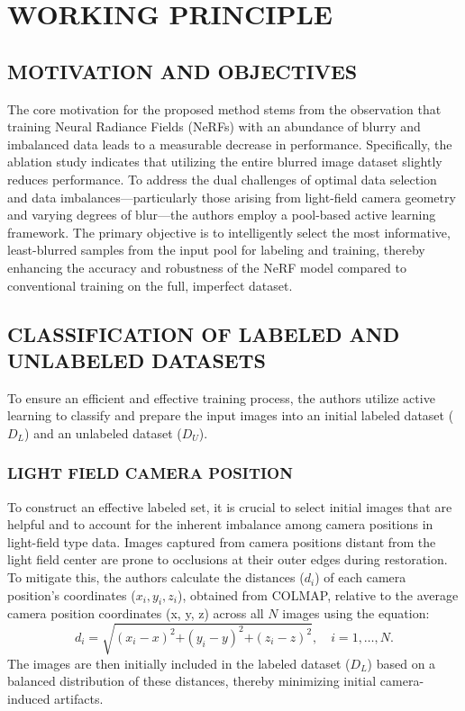 \chapter{\MakeUppercase{Working Principle}}
\setcounter{equation}{0}

\section{\MakeUppercase{Motivation and Objectives}}
The core motivation for the proposed method stems from the observation that training Neural Radiance Fields (NeRFs) with an abundance of blurry and imbalanced data leads to a measurable decrease in performance. Specifically, the ablation study indicates that utilizing the entire blurred image dataset slightly reduces performance. To address the dual challenges of optimal data selection and data imbalances—particularly those arising from light-field camera geometry and varying degrees of blur—the authors employ a pool-based active learning framework. The primary objective is to intelligently select the most informative, least-blurred samples from the input pool for labeling and training, thereby enhancing the accuracy and robustness of the NeRF model compared to conventional training on the full, imperfect dataset.

\section{\MakeUppercase{Classification of Labeled and Unlabeled Datasets}}
To ensure an efficient and effective training process, the authors utilize active learning to classify and prepare the input images into an initial labeled dataset ($D_L$) and an unlabeled dataset ($D_U$).\cite{bib14}

\subsection{\MakeUppercase{Light Field Camera Position}}
To construct an effective labeled set, it is crucial to select initial images that are helpful and to account for the inherent imbalance among camera positions in light-field type data. Images captured from camera positions distant from the light field center are prone to occlusions at their outer edges during restoration. To mitigate this, the authors calculate the distances ($d_i$) of each camera position's coordinates ($x_i, y_i, z_i$), obtained from COLMAP, relative to the average camera position coordinates (x, y, z) across all $N$ images using the equation:
\[
    d_i = \sqrt{\left(x_i - x\right)^2 \text{+} \left(y_i - y\right)^2 \text{+} \left(z_i - z\right)^2}, \quad i = 1, \ldots, N.
\]
The images are then initially included in the labeled dataset ($D_L$) based on a balanced distribution of these distances, thereby minimizing initial camera-induced artifacts.

